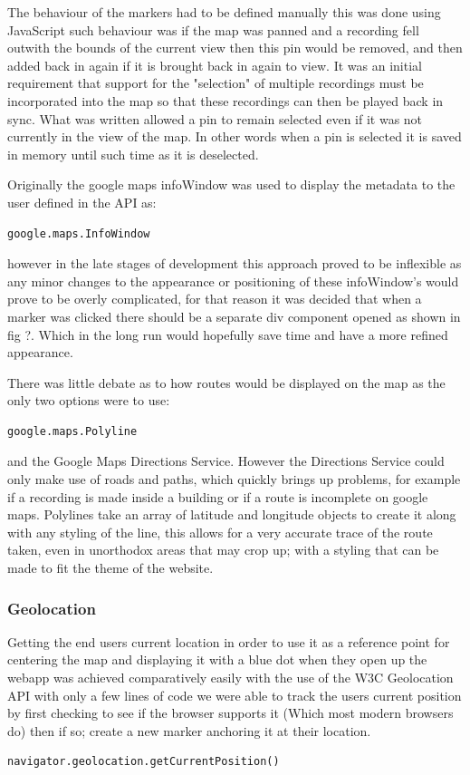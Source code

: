 \documentclass{l3proj}
\begin{document}
The behaviour of the markers had to be defined manually this was done using JavaScript such behaviour was if the map was panned and a recording fell outwith the bounds of the current view then this pin would be removed, and then added back in again if it is brought back in again to view. It was an initial requirement that support for the "selection" of multiple recordings must be incorporated into the map so that these recordings can then be played back in sync. What was written allowed a pin to remain selected even if it was not currently in the view of the map. In other words when a pin is selected it is saved in memory until such time as it is deselected.

Originally the google maps infoWindow was used to display the metadata to the user defined in the API as:
\begin{verbatim}
google.maps.InfoWindow
\end{verbatim}
however in the late stages of development this approach proved to be inflexible as any minor changes to the appearance or positioning of these infoWindow’s would prove to be overly complicated, for that reason it was decided that when a marker was clicked there should be a separate div component opened as shown in fig ?. Which in the long run would hopefully save time and have a more refined appearance.

There was little debate as to how routes would be displayed on the map as the only two options were to use:
\begin{verbatim}
google.maps.Polyline
\end{verbatim}
and the Google Maps Directions Service. However the Directions Service could only make use of roads and paths, which quickly brings up problems, for example if a recording is made inside a building or if a route is incomplete on google maps. Polylines take an array of latitude and longitude objects to create it along with any styling of the line, this allows for a very accurate trace of the route taken, even in unorthodox areas that may crop up; with a styling that can be made to fit the theme of the website.

\subsubsection{Geolocation}

Getting the end users current location in order to use it as a reference point for centering the map and displaying it with a blue dot when they open up the webapp was achieved comparatively easily with the use of the W3C Geolocation API with only a few lines of code we were able to track the users current position by first checking to see if the browser supports it (Which most modern browsers do) then if so; create a new marker anchoring it at their location.
\begin{verbatim}
navigator.geolocation.getCurrentPosition()
\end{verbatim}
\end{document}
